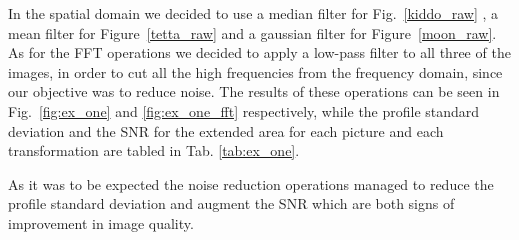 \documentclass[a4paper]{article}
\begin{document}
In the spatial domain we decided to use a median filter for Fig.~\ref{kiddo_raw} , a mean filter for Figure~\ref{tetta_raw} and a gaussian filter for Figure~\ref{moon_raw}. As for the FFT operations we decided to apply a low-pass filter to all three of the images, in order to cut all the high frequencies from the frequency domain, since our objective was to reduce noise. The results of these operations can be seen in Fig.~\ref{fig:ex_one} and \ref{fig:ex_one_fft} respectively, while the profile standard deviation and the SNR for the extended area for each picture and each transformation are tabled in Tab. \ref{tab:ex_one}.

As it was to be expected the noise reduction operations managed to reduce the profile standard deviation and augment the SNR which are both signs of improvement in image quality.
\end{document}
